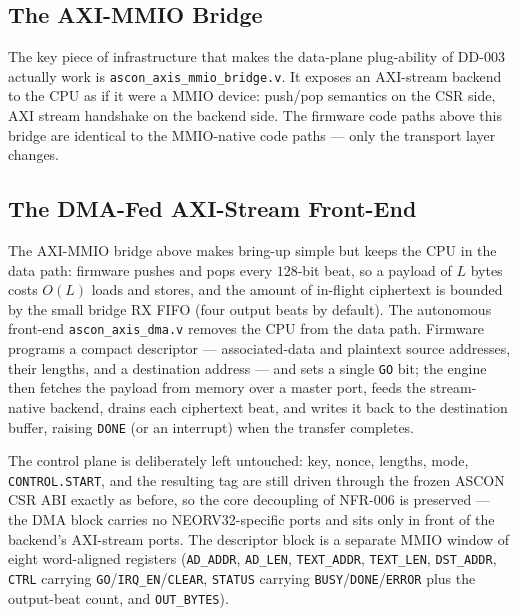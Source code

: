 \documentclass[11pt,a4paper]{article}
\begin{document}
\subsection{The AXI-MMIO Bridge}

The key piece of infrastructure that makes the data-plane plug-ability
of DD-003 actually work is \texttt{ascon\_axis\_mmio\_bridge.v}. It
exposes an AXI-stream backend to the CPU as if it were a MMIO device:
push/pop semantics on the CSR side, AXI stream handshake on the backend
side. The firmware code paths above this bridge are identical to the
MMIO-native code paths --- only the transport layer changes.

\subsection{The DMA-Fed AXI-Stream Front-End}
\label{sec:dma}

The AXI-MMIO bridge above makes bring-up simple but keeps the CPU in the
data path: firmware pushes and pops every $128$-bit beat, so a payload
of $L$ bytes costs $O(L)$ loads and stores, and the amount of in-flight
ciphertext is bounded by the small bridge RX FIFO (four output beats by
default). The autonomous front-end \texttt{ascon\_axis\_dma.v} removes
the CPU from the data path. Firmware programs a compact descriptor ---
associated-data and plaintext source addresses, their lengths, and a
destination address --- and sets a single \texttt{GO} bit; the engine
then fetches the payload from memory over a master port, feeds the
stream-native backend, drains each ciphertext beat, and writes it back
to the destination buffer, raising \texttt{DONE} (or an interrupt) when
the transfer completes.

The control plane is deliberately left untouched: key, nonce, lengths,
mode, \texttt{CONTROL.START}, and the resulting tag are still driven
through the frozen ASCON CSR ABI exactly as before, so the core
decoupling of NFR-006 is preserved --- the DMA block carries no
NEORV32-specific ports and sits only in front of the backend's
AXI-stream ports. The descriptor block is a separate MMIO window of
eight word-aligned registers (\texttt{AD\_ADDR}, \texttt{AD\_LEN},
\texttt{TEXT\_ADDR}, \texttt{TEXT\_LEN}, \texttt{DST\_ADDR},
\texttt{CTRL} carrying \texttt{GO}/\texttt{IRQ\_EN}/\texttt{CLEAR},
\texttt{STATUS} carrying \texttt{BUSY}/\texttt{DONE}/\texttt{ERROR} plus
the output-beat count, and \texttt{OUT\_BYTES}).
\end{document}
